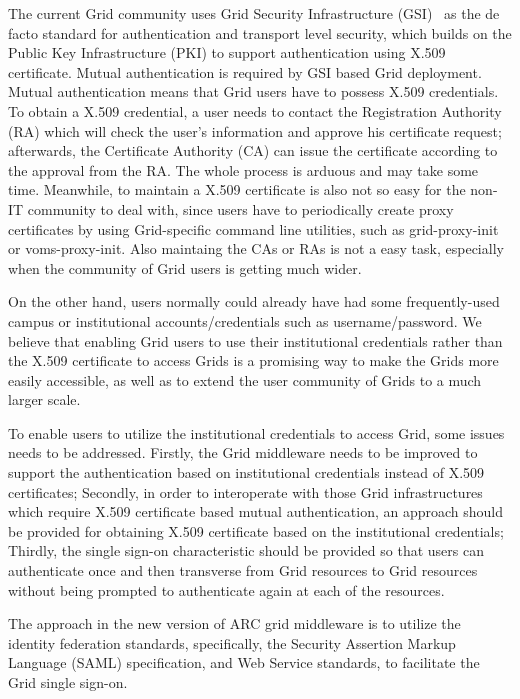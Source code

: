\documentclass[conference]{IEEEtran}
\begin{document}
The current Grid community uses Grid Security Infrastructure (GSI)~\cite{IFoster98} as the de facto 
standard for authentication and transport level security, which builds on the Public Key Infrastructure
(PKI) to support authentication using X.509 certificate. Mutual authentication is required 
by GSI based Grid deployment. Mutual authentication means that Grid users have to possess X.509 
credentials. To obtain a X.509 credential, a user needs to contact the Registration Authority (RA)
which will check the user's information and approve his certificate request; afterwards,
the Certificate Authority (CA) can issue the certificate according to the approval from 
the RA. The whole process is arduous and may take some time.
Meanwhile, to maintain a X.509 certificate is also not so easy for the non-IT community to deal 
with, since users have to periodically create proxy certificates by using Grid-specific command line 
utilities, such as grid-proxy-init or voms-proxy-init. Also maintaing the CAs or RAs is not a  
easy task, especially when the community of Grid users is getting much wider.

On the other hand, users normally could already have had some frequently-used campus or institutional 
accounts/credentials such as username/password. We believe that enabling Grid users to use their institutional 
credentials rather than the X.509 certificate to access Grids is a promising way 
to make the Grids more easily accessible, as well as to extend the user community of Grids
to a much larger scale.

To enable users to utilize the institutional credentials to access Grid, some issues needs to be 
addressed. Firstly, the Grid middleware needs to be improved to support the authentication based on
institutional credentials instead of X.509 certificates; Secondly, in order to interoperate with
those Grid infrastructures which require X.509 certificate based mutual authentication, an approach
should be provided for obtaining X.509 certificate based on the institutional credentials; Thirdly,
the single sign-on characteristic should be provided so that users can authenticate once and then transverse 
from Grid resources to Grid resources without being prompted to authenticate again at each of the resources.

The approach in the new version of ARC grid middleware is to utilize the identity federation 
standards, specifically, the Security Assertion Markup Language (SAML) specification, and Web 
Service standards, to facilitate the Grid single sign-on.
\end{document}
